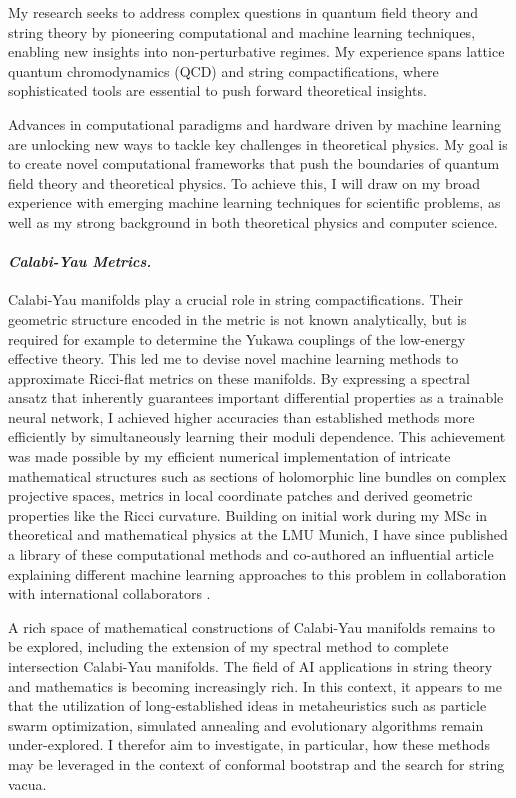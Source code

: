 \documentclass[11pt]{article}
\title{}
\author{}
\date{}
\begin{document}
\thispagestyle{firstpagestyle}


My research seeks to address complex questions in quantum field theory and string theory by pioneering computational and machine learning techniques, enabling new insights into non-perturbative regimes.
My experience spans lattice quantum chromodynamics (QCD) and string compactifications, where sophisticated tools are essential to push forward theoretical insights.

Advances in computational paradigms and hardware driven by machine learning are unlocking new
ways to tackle key challenges in theoretical physics. My goal is to create novel computational
frameworks that push the boundaries of quantum field theory and theoretical physics. To achieve
this, I will draw on my broad experience with emerging machine learning techniques for scientific
problems, as well as my strong background in both theoretical physics and computer science.

\paragraph{\textit{{Calabi-Yau Metrics.}}}
Calabi-Yau manifolds play a crucial role in string compactifications.
Their geometric structure encoded in the metric is not known analytically, but is required for example to determine the Yukawa couplings of the low-energy effective theory.
This led me to devise novel machine learning methods to approximate Ricci-flat metrics on these manifolds.
By expressing a spectral ansatz that inherently guarantees important differential properties as a trainable neural network, I achieved higher accuracies than established methods more efficiently by simultaneously learning their moduli dependence.
This achievement was made possible by my efficient numerical implementation of intricate mathematical structures such as sections of holomorphic line bundles on complex projective spaces, metrics in local coordinate patches and derived geometric properties like the Ricci curvature.
Building on initial work during my MSc in theoretical and mathematical physics at the LMU Munich, I have since published a library of these computational methods \cite{gerdes2023CYJAXPackage} and co-authored an influential article explaining different machine learning approaches to this problem in collaboration with international collaborators \cite{anderson2021ModulidependentCalabiYau}.

\textbf{\color{royalblue}{Future Directions.}}
A rich space of mathematical constructions of Calabi-Yau manifolds remains to be explored, including the extension of my spectral method to complete intersection Calabi-Yau manifolds.
The field of AI applications in string theory and mathematics is becoming increasingly rich.
In this context, it appears to me that the utilization of long-established ideas in metaheuristics such as particle swarm optimization, simulated annealing and evolutionary algorithms remain under-explored.
I therefor aim to investigate, in particular, how these methods may be leveraged in the context of conformal bootstrap and the search for string vacua.
\end{document}
